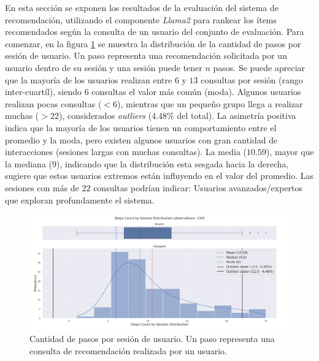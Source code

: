 \documentclass[11pt,a4paper,twoside]{thesis}
\begin{document}
En esta sección se exponen los resultados de la evaluación del sistema de recomendación, utilizando el componente \textit{Llama2} para rankear los ítems recomendados según la consulta de un usuario del conjunto de evaluación. Para comenzar, en la figura \ref{fig:llama2-steps_count_by_session_distribution} se muestra la distribución de la cantidad de pasos por sesión de usuario. Un paso representa una recomendación solicitada por un usuario dentro de su sesión y una sesión puede tener $n$ pasos. Se puede apreciar que la mayoría de los usuarios realizan entre $6$ y $13$ consultas por sesión (rango inter-cuartíl), siendo $6$ consultas el valor más común (moda).
Algunos usuarios realizan pocas consultas ($<6$), mientras que un pequeño grupo llega a realizar muchas ($>22$), considerados \textit{outliers} ($4.48\%$ del total). La asimetría positiva indica que la mayoría de los usuarios tienen un comportamiento entre el promedio y la moda, pero existen algunos usuarios con gran cantidad de interacciones (sesiones largas con muchas consultas). La media ($10.59$), mayor que la mediana ($9$), indicando que la distribución esta sesgada hacia la derecha, sugiere que estos usuarios extremos están influyendo en el valor del promedio. Las sesiones con más de $22$ consultas podrían indicar: Usuarios avanzados/expertos que exploran profundamente el sistema.

\begin{figure}[H]
	\centering
	\includegraphics[width=15cm]{./images/llama2/steps_count_by_session_distribution.png}
	\caption{Cantidad de pasos por sesión de usuario. Un paso representa una consulta de recomendación realizada por un usuario.}
	\label{fig:llama2-steps_count_by_session_distribution}
\end{figure}
\end{document}
